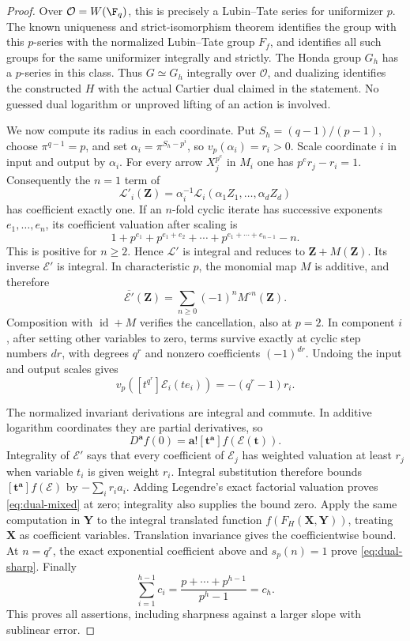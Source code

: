 \documentclass[11pt,a4paper]{article}
\theoremstyle{definition}\newtheorem{remark}[theorem]{Remark}
\newcommand{\id}{\operatorname{id}}\newcommand{\Hom}{\operatorname{Hom}}
\begin{document}
\begin{proof}
Over $\mathcal O=W(\F_q)$, this is precisely a Lubin--Tate series for uniformizer $p$. The known uniqueness and strict-isomorphism theorem \cite[\S5, pp.~76--77, (5.1)--(5.4)]{Hazewinkel} identifies the group with this $p$-series with the normalized Lubin--Tate group $F_f$, and identifies all such groups for the same uniformizer integrally and strictly. The Honda group $G_h$ has a $p$-series in this class. Thus $G\simeq G_h$ integrally over $\mathcal O$, and dualizing identifies the constructed $H$ with the actual Cartier dual claimed in the statement. No guessed dual logarithm or unproved lifting of an action is involved.

We now compute its radius in each coordinate. Put $S_h=(q-1)/(p-1)$, choose $\pi^{q-1}=p$, and set $\alpha_i=\pi^{S_h-p^i}$, so $v_p(\alpha_i)=r_i>0$. Scale coordinate $i$ in input and output by $\alpha_i$. For every arrow $X_j^{p^e}$ in $M_i$ one has $p^er_j-r_i=1$. Consequently the $n=1$ term of
\[
 \mathcal L'_i(\mathbf Z)=\alpha_i^{-1}\mathcal L_i(\alpha_1Z_1,\ldots,\alpha_dZ_d)
\]
has coefficient exactly one. If an $n$-fold cyclic iterate has successive exponents $e_1,\ldots,e_n$, its coefficient valuation after scaling is
\[
 1+p^{e_1}+p^{e_1+e_2}+\cdots+p^{e_1+\cdots+e_{n-1}}-n.
\]
This is positive for $n\ge2$. Hence $\mathcal L'$ is integral and reduces to $\mathbf Z+M(\mathbf Z)$. Its inverse $\mathcal E'$ is integral. In characteristic $p$, the monomial map $M$ is additive, and therefore
\[
 \overline{\mathcal E'}(\mathbf Z)=\sum_{n\ge0}(-1)^nM^{\circ n}(\mathbf Z).
\]
Composition with $\id+M$ verifies the cancellation, also at $p=2$. In component $i$, after setting other variables to zero, terms survive exactly at cyclic step numbers $dr$, with degrees $q^r$ and nonzero coefficients $(-1)^{dr}$. Undoing the input and output scales gives
\[
 v_p([t^{q^r}]\mathcal E_i(t e_i))=-(q^r-1)r_i.
\]

The normalized invariant derivations are integral and commute. In additive logarithm coordinates they are partial derivatives, so
\[
 D^{\mathbf a}f(0)=\mathbf a![\mathbf t^{\mathbf a}]f(\mathcal E(\mathbf t)).
\]
Integrality of $\mathcal E'$ says that every coefficient of $\mathcal E_j$ has weighted valuation at least $r_j$ when variable $t_i$ is given weight $r_i$. Integral substitution therefore bounds $[\mathbf t^{\mathbf a}]f(\mathcal E)$ by $-\sum_i r_i a_i$. Adding Legendre's exact factorial valuation proves \eqref{eq:dual-mixed} at zero; integrality also supplies the bound zero. Apply the same computation in $\mathbf Y$ to the integral translated function $f(F_H(\mathbf X,\mathbf Y))$, treating $\mathbf X$ as coefficient variables. Translation invariance gives the coefficientwise bound. At $n=q^r$, the exact exponential coefficient above and $s_p(n)=1$ prove \eqref{eq:dual-sharp}. Finally
\[
 \sum_{i=1}^{h-1}c_i=\frac{p+\cdots+p^{h-1}}{p^h-1}=c_h.
\]
This proves all assertions, including sharpness against a larger slope with sublinear error.
\end{proof}
\end{document}
